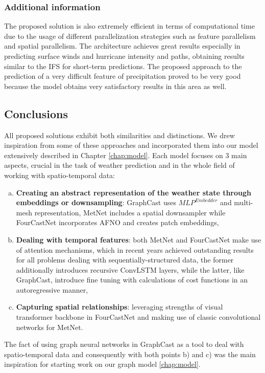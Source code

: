 \subsubsection{Additional information}
The proposed solution is also extremely efficient in terms of computational time due to the usage of different parallelization strategies such as feature parallelism and spatial parallelism. The architecture achieves great results especially in predicting surface winds and hurricane intensity and paths, obtaining results similar to the IFS \cite{ECMWFIFS} for short-term predictions. The proposed approach to the prediction of a very difficult feature of precipitation proved to be very good because the model obtains very satisfactory results in this area as well.

\subsection{Conclusions}
All proposed solutions exhibit both similarities and distinctions. We drew inspiration from some of these approaches and incorporated them into our model extensively described in Chapter \ref{chap:model}. Each model focuses on 3 main aspects, crucial in the task of weather prediction and in the whole field of working with spatio-temporal data:
\begin{enumerate}[a)]
    \item \textbf{Creating an abstract representation of the weather state through embeddings or downsampling}: GraphCast uses $MLP^{Embedder}$ and multi-mesh representation, MetNet includes a spatial downsampler while FourCastNet incorporates AFNO and creates patch embeddings,
    \item \textbf{Dealing with temporal features}: both MetNet and FourCastNet make use of attention mechanisms, which in recent years achieved outstanding results for all problems dealing with sequentially-structured data, the former additionally introduces recursive ConvLSTM layers, while the latter, like GraphCast, introduce fine tuning with calculations of cost functions in an autoregressive manner,
    \item \textbf{Capturing spatial relationships}: leveraging strengths of visual transformer backbone in FourCastNet and making use of classic convolutional networks for MetNet.
\end{enumerate}

The fact of using graph neural networks in GraphCast as a tool to deal with spatio-temporal data and consequently with both points b) and c) was the main inspiration for starting work on our graph model \ref{chap:model}.

